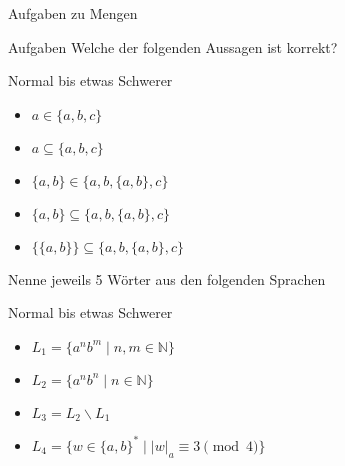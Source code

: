 {
\begin{frame}[fragile]{Aufgaben zu Mengen}
    \begin{alertblock}{Aufgaben}
        Welche der folgenden Aussagen ist korrekt?
    \end{alertblock}
    \begin{block}{Normal bis etwas Schwerer}
        \begin{minipage}[t]{0.45\textwidth}
            \begin{itemize}
                \item $a \in \{a, b, c\}$
                \item $a \subseteq \{a, b, c\}$
                \item $\{a,b\} \in \{a, b, \{a, b\}, c\}$
            \end{itemize}
        \end{minipage}
        \begin{minipage}[t]{0.45\textwidth}
            \begin{itemize}
                \item $\{a,b\} \subseteq \{a, b, \{a, b\}, c\}$
                \item $\{\{a,b\}\} \subseteq \{a, b, \{a, b\}, c\}$
            \end{itemize}
        \end{minipage}
    \end{block}
    Nenne jeweils 5 Wörter aus den folgenden Sprachen
    \begin{block}{Normal bis etwas Schwerer}
        \begin{itemize}
            \item $L_1 = \{a^nb^m \mid n, m \in \mathbb{N}\}$
            \item $L_2 = \{a^nb^n \mid n \in \mathbb{N}\}$
            \item $L_3 = L_2 \backslash L_1$
            \item $L_4 = \{w \in \{a,b\}^* \mid |w|_a \equiv 3 \pmod{4}\}$
        \end{itemize}
    \end{block}
\end{frame}
}

